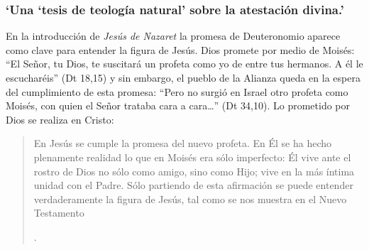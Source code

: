 \subsubsection{\enquote*{Una `tesis de teología natural' sobre la atestación divina.}}

En la introducción de \emph{Jesús de Nazaret} la promesa de Deuteronomio aparece como clave para entender la figura de Jesús. Dios promete por medio de Moisés: \enquote{El Señor, tu Dios, te suscitará un profeta como yo de entre tus hermanos. A él le escucharéis} (Dt 18,15) y sin embargo, el pueblo de la Alianza queda en la espera del cumplimiento de esta promesa: \enquote{Pero no surgió en Israel otro profeta como Moisés, con quien el Señor trataba cara a cara\ldots} (Dt 34,10). Lo prometido por Dios se realiza en Cristo: \blockquote[{\Cite[28]{ratzinger2007jdenaz}}.]{En Jesús se cumple la promesa del nuevo profeta. En Él se ha hecho plenamente realidad lo que en Moisés era sólo imperfecto: Él vive ante el rostro de Dios no sólo como amigo, sino como Hijo; vive en la más íntima unidad con el Padre. Sólo partiendo de esta afirmación se puede entender verdaderamente la figura de Jesús, tal como se nos muestra en el Nuevo Testamento}

